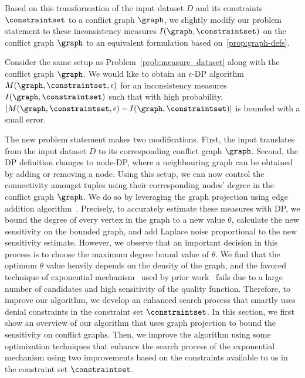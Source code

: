 Based on this transformation of the input dataset $D$ and its constraints $\constraintset$ to a conflict graph $\graph$, we slightly modify our problem statement to these inconsistency measures $I(\graph, \constraintset)$ on the conflict graph $\graph$ to an equivalent formulation based on~\cref{prop:graph-defs}.

\begin{problem}\label{prob:measure_graph}
Consider the same setup as Problem~\ref{prob:measure_dataset} along with the conflict graph $\graph$. We would like to obtain an $\epsilon$-DP algorithm $M(\graph, \constraintset, \epsilon)$ for an inconsistency measures $I(\graph, \constraintset)$ such that with high probability, $|M(\graph, \constraintset, \epsilon) - I(\graph, \constraintset)|$ is bounded with a small error.
\end{problem}

The new problem statement makes two modifications. First, the input translates from the input dataset $D$ to its corresponding conflict graph $\graph$. Second, the DP definition changes to node-DP, where a neighbouring graph can be obtained by adding or removing a node. Using this setup, we can now control the connectivity amongst tuples using their corresponding nodes' degree in the conflict graph $\graph$. We do so by leveraging the graph projection using edge addition algorithm~\cite{day2016publishing}. Precisely, to accurately estimate these measures with DP, we bound the degree of every vertex in the graph to a new value $\theta$, calculate the new sensitivity on the bounded graph, and add Laplace noise proportional to the new sensitivity estimate. However, we observe that an important decision in this process is to choose the maximum degree bound value of $\theta$. We find that the optimum $\theta$ value heavily depends on the density of the graph, and the favored technique of exponential mechanism~\cite{mcsherry2007mechanism} used by prior work~\cite{day2016publishing} fails due to a large number of candidates and high sensitivity of the quality function. Therefore, to improve our algorithm, we develop an enhanced search process that smartly uses denial constraints in the constraint set $\constraintset$. In this section, we first show an overview of our algorithm that uses graph projection to bound the sensitivity on conflict graphs. Then, we improve the algorithm using some optimization techniques that enhance the search process of the exponential mechanism using two improvements based on the constraints available to us in the constraint set $\constraintset$.   

